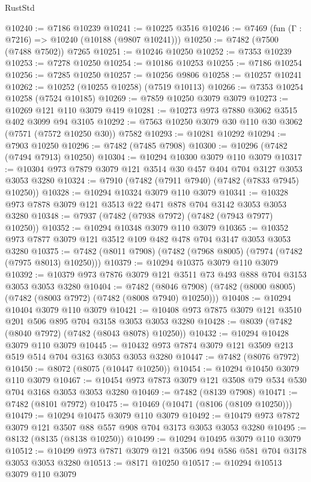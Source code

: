 \begin{lexlean}{RustStd}
\begin{coremodule}
@10240 := @7186 @10239
@10241 := @10225 @3516
@10246 := @7469 (fun (Γ : @7216) => @10240 (@10188 (@9807 @10241)))
@10250 := @7482 (@7500 (@7488 @7502)) @7265
@10251 := @10246 @10250
@10252 := @7353 @10239
@10253 := @7278 @10250
@10254 := @10186 @10253
@10255 := @7186 @10254
@10256 := @7285 @10250
@10257 := @10256 @9806
@10258 := @10257 @10241
@10262 := @10252 (@10255 @10258) (@7519 @10113)
@10266 := @7353 @10254 @10258 (@7524 @10185)
@10269 := @7859 @10250 @3079 @3079
@10273 := @10269 @121 @110 @3079 @419
@10281 := @10273 @973 @7880 @3062 @3515 @402 @3099 @94 @3105
@10292 := @7563 @10250 @3079 @30 @110 @30 @3062 (@7571 (@7572 @10250 @30)) @7582
@10293 := @10281 @10292
@10294 := @7903 @10250
@10296 := @7482 (@7485 @7908)
@10300 := @10296 (@7482 (@7494 @7913) @10250)
@10304 := @10294 @10300 @3079 @110 @3079
@10317 := @10304 @973 @7879 @3079 @121 @3514 @30 @457 @404 @704 @3127 @3053 @3053 @3280
@10324 := @7910 (@7482 (@7911 @7940) (@7482 (@7833 @7945) @10250))
@10328 := @10294 @10324 @3079 @110 @3079
@10341 := @10328 @973 @7878 @3079 @121 @3513 @22 @471 @878 @704 @3142 @3053 @3053 @3280
@10348 := @7937 (@7482 (@7938 @7972) (@7482 (@7943 @7977) @10250))
@10352 := @10294 @10348 @3079 @110 @3079
@10365 := @10352 @973 @7877 @3079 @121 @3512 @109 @482 @478 @704 @3147 @3053 @3053 @3280
@10375 := @7482 (@8011 @7908) (@7482 (@7968 @8005) (@7974 (@7482 (@7975 @8013) @10250)))
@10379 := @10294 @10375 @3079 @110 @3079
@10392 := @10379 @973 @7876 @3079 @121 @3511 @73 @493 @888 @704 @3153 @3053 @3053 @3280
@10404 := @7482
    (@8046 @7908)
    (@7482 (@8000 @8005) (@7482 (@8003 @7972) (@7482 (@8008 @7940) @10250)))
@10408 := @10294 @10404 @3079 @110 @3079
@10421 := @10408 @973 @7875 @3079 @121 @3510 @201 @506 @895 @704 @3158 @3053 @3053 @3280
@10428 := @8039 (@7482 (@8040 @7972) (@7482 (@8043 @8078) @10250))
@10432 := @10294 @10428 @3079 @110 @3079
@10445 := @10432 @973 @7874 @3079 @121 @3509 @213 @519 @514 @704 @3163 @3053 @3053 @3280
@10447 := @7482 (@8076 @7972)
@10450 := @8072 (@8075 (@10447 @10250))
@10454 := @10294 @10450 @3079 @110 @3079
@10467 := @10454 @973 @7873 @3079 @121 @3508 @79 @534 @530 @704 @3168 @3053 @3053 @3280
@10469 := @7482 (@8139 @7908)
@10471 := @7482 (@8101 @7972)
@10475 := @10469 (@10471 (@8106 (@8109 @10250)))
@10479 := @10294 @10475 @3079 @110 @3079
@10492 := @10479 @973 @7872 @3079 @121 @3507 @88 @557 @908 @704 @3173 @3053 @3053 @3280
@10495 := @8132 (@8135 (@8138 @10250))
@10499 := @10294 @10495 @3079 @110 @3079
@10512 := @10499 @973 @7871 @3079 @121 @3506 @94 @586 @581 @704 @3178 @3053 @3053 @3280
@10513 := @8171 @10250
@10517 := @10294 @10513 @3079 @110 @3079

\end{coremodule}
\end{lexlean}

